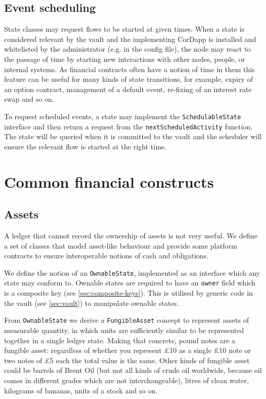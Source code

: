 \documentclass{article}
\begin{document}
\subsection{Event scheduling}\label{sec:event-scheduling}

State classes may request flows to be started at given times. When a state is considered relevant by the vault and the
implementing CorDapp is installed and whitelisted by the administrator (e.g. in the config file), the node may react to
the passage of time by starting new interactions with other nodes, people, or internal systems. As financial contracts
often have a notion of time in them this feature can be useful for many kinds of state transitions, for example, expiry
of an option contract, management of a default event, re-fixing of an interest rate swap and so on.

To request scheduled events, a state may implement the \texttt{SchedulableState} interface and then return a
request from the \texttt{nextScheduledActivity} function. The state will be queried when it is committed to the
vault and the scheduler will ensure the relevant flow is started at the right time.

\section{Common financial constructs}\label{sec:assets}

\subsection{Assets}
A ledger that cannot record the ownership of assets is not very useful. We define a set of classes that model
asset-like behaviour and provide some platform contracts to ensure interoperable notions of cash and obligations.

We define the notion of an \texttt{OwnableState}, implemented as an interface which any state may conform to. Ownable
states are required to have an \texttt{owner} field which is a composite key (see \cref{sec:composite-keys}). This is
utilised by generic code in the vault (see \cref{sec:vault}) to manipulate ownable states.


From \texttt{OwnableState} we derive a \texttt{FungibleAsset} concept to represent assets of measurable quantity, in
which units are sufficiently similar to be represented together in a single ledger state. Making that concrete, pound notes
are a fungible asset: regardless of whether you represent \pounds10 as a single \pounds10 note or two notes of \pounds5
each the total value is the same. Other kinds of fungible asset could be barrels of Brent Oil (but not all kinds of
crude oil worldwide, because oil comes in different grades which are not interchangeable), litres of clean water,
kilograms of bananas, units of a stock and so on.
\end{document}
